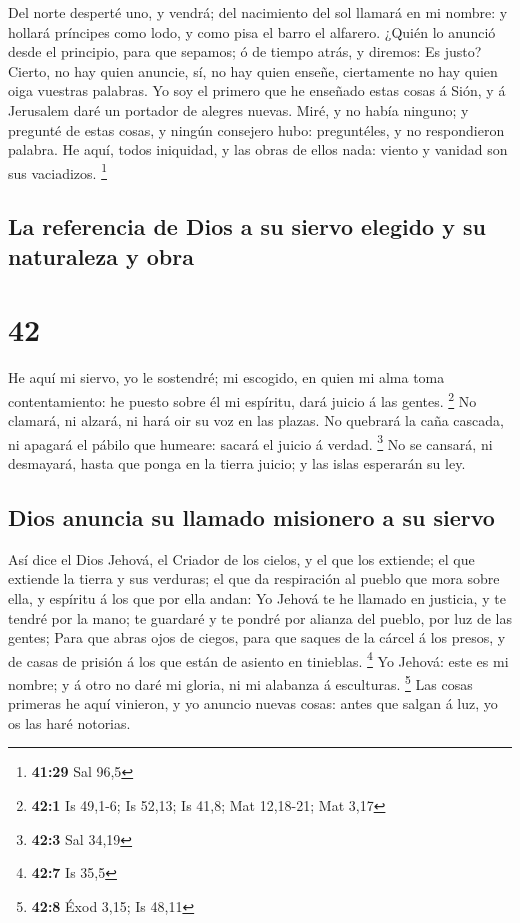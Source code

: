  Del norte desperté uno, y vendrá; del nacimiento del sol
llamará en mi nombre: y hollará príncipes como lodo, y como pisa el
barro el alfarero.  ¿Quién lo anunció desde el principio,
para que sepamos; ó de tiempo atrás, y diremos: Es justo? Cierto, no hay
quien anuncie, sí, no hay quien enseñe, ciertamente no hay quien oiga
vuestras palabras.  Yo soy el primero que he enseñado
estas cosas á Sión, y á Jerusalem daré un portador de alegres nuevas.
 Miré, y no había ninguno; y pregunté de estas cosas, y
ningún consejero hubo: preguntéles, y no respondieron palabra.
 He aquí, todos iniquidad, y las obras de ellos nada:
viento y vanidad son sus vaciadizos. \footnote{\textbf{41:29} Sal 96,5}

\hypertarget{la-referencia-de-dios-a-su-siervo-elegido-y-su-naturaleza-y-obra}{%
\subsection{La referencia de Dios a su siervo elegido y su naturaleza y
obra}\label{la-referencia-de-dios-a-su-siervo-elegido-y-su-naturaleza-y-obra}}

\hypertarget{section-41}{%
\section{42}\label{section-41}}

 He aquí mi siervo, yo le sostendré; mi escogido, en quien
mi alma toma contentamiento: he puesto sobre él mi espíritu, dará juicio
á las gentes. \footnote{\textbf{42:1} Is 49,1-6; Is 52,13; Is 41,8; Mat
  12,18-21; Mat 3,17}  No clamará, ni alzará, ni hará oir
su voz en las plazas.  No quebrará la caña cascada, ni
apagará el pábilo que humeare: sacará el juicio á verdad. \footnote{\textbf{42:3}
  Sal 34,19}  No se cansará, ni desmayará, hasta que ponga
en la tierra juicio; y las islas esperarán su ley.

\hypertarget{dios-anuncia-su-llamado-misionero-a-su-siervo}{%
\subsection{Dios anuncia su llamado misionero a su
siervo}\label{dios-anuncia-su-llamado-misionero-a-su-siervo}}

 Así dice el Dios Jehová, el Criador de los cielos, y el
que los extiende; el que extiende la tierra y sus verduras; el que da
respiración al pueblo que mora sobre ella, y espíritu á los que por ella
andan:  Yo Jehová te he llamado en justicia, y te tendré
por la mano; te guardaré y te pondré por alianza del pueblo, por luz de
las gentes;  Para que abras ojos de ciegos, para que
saques de la cárcel á los presos, y de casas de prisión á los que están
de asiento en tinieblas. \footnote{\textbf{42:7} Is 35,5} 
Yo Jehová: este es mi nombre; y á otro no daré mi gloria, ni mi alabanza
á esculturas. \footnote{\textbf{42:8} Éxod 3,15; Is 48,11}
 Las cosas primeras he aquí vinieron, y yo anuncio nuevas
cosas: antes que salgan á luz, yo os las haré notorias.

